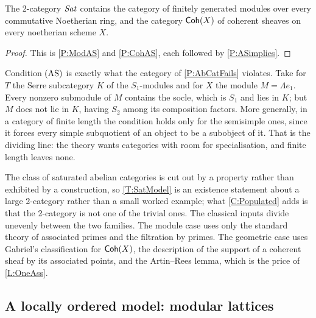 \begin{corollary}
  \label{C:Populated} 
  The 2-category \(\mathit{Sat}\) contains the category of finitely generated modules over every commutative Noetherian ring, and the category \(\mathsf{Coh}(X)\) of coherent sheaves on every noetherian scheme \(X\).
\end{corollary}

\begin{proof}
  This is \prox\ref{P:ModAS} and \prox\ref{P:CohAS}, each followed by \prox\ref{P:ASimplies}.
\end{proof}

\begin{remark}
  \label{Rem WhereNot}
  Condition \(\textup{(AS)}\) is exactly what the category of \prox\ref{P:AbCatFails} violates. Take for \(T\) the Serre subcategory \(K\) of the \(S_{1}\)-modules and for \(X\) the module \(M=\Lambda e_{1}\). Every nonzero submodule of \(M\) contains the socle, which is \(S_{1}\) and lies in \(K\); but \(M\) does not lie in \(K\), having \(S_{2}\) among its composition factors. More generally, in a category of finite length the condition holds only for the semisimple ones, since it forces every simple subquotient of an object to be a subobject of it. That is the dividing line: the theory wants categories with room for specialisation, and finite length leaves none.
\end{remark}

\begin{remark}
  \label{Rem Model Shape}
  The class of saturated abelian categories is cut out by a property rather than exhibited by a construction, so \thex\ref{T:SatModel} is an existence statement about a large 2-category rather than a small worked example; what \corx\ref{C:Populated} adds is that the 2-category is not one of the trivial ones. The classical inputs divide unevenly between the two families. The module case uses only the standard theory of associated primes and the filtration by primes. The geometric case uses Gabriel's classification for \(\mathsf{Coh}(X)\), the description of the support of a coherent sheaf by its associated points, and the Artin--Rees lemma, which is the price of \lemx\ref{L:OneAss}.
\end{remark}

\subsection{A locally ordered model: modular lattices}\label{SS:ModelLattices}

